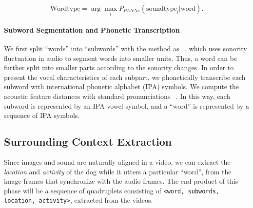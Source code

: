 \begin{equation}
\text{Wordtype} = \arg\max_{i} P_{PANNs}(\text{soundtype}_i | \text{word}).
\end{equation}


\paragraph{Subword Segmentation and Phonetic Transcription}
We first split ``words'' into ``subwords'' with the method as ~\cite{rasanen2018pre}, which uses sonority fluctuation in audio to segment words into smaller units. Thus, a word can be further split into smaller parts according to the sonority changes. In order to present the vocal characteristics of each subpart, we phonetically transcribe each subword with international phonetic alphabet (IPA) symbols. We compute the acoustic feature distances with standard pronunciations ~\cite{ipa0, ipa1}. In this way, each subword is represented by an IPA vowel symbol, and a ``word'' is represented by a sequence of IPA symbols. 

\subsection{Surrounding Context Extraction}
\label{sec:infer_context}
Since images and sound are naturally aligned in a video,  we can extract the \textit{location} and \textit{activity} of the dog while it utters a particular ``word'', from the image frames that synchronize with the audio frames. The end product of this phase will be a sequence of quadruplets  consisting of \texttt{<word, subwords, location, activity>}, extracted from the videos. 

